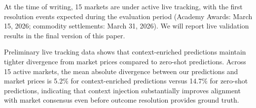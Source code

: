 At the time of writing, 15 markets are under active live tracking, with the first resolution events expected during the evaluation period (Academy Awards: March 15, 2026; commodity settlements: March 31, 2026). We will report live validation results in the final version of this paper.

Preliminary live tracking data shows that context-enriched predictions maintain tighter divergence from market prices compared to zero-shot predictions. Across 15 active markets, the mean absolute divergence between our predictions and market prices is 5.2\% for context-enriched predictions versus 14.7\% for zero-shot predictions, indicating that context injection substantially improves alignment with market consensus even before outcome resolution provides ground truth.
